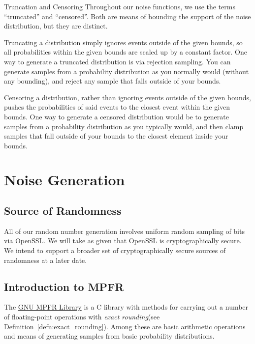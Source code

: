 \documentclass[11pt]{scrartcl} %
\begin{document}
\begin{definition}
	\label{def:truncation_censoring}
	Truncation and Censoring \newline
	Throughout our noise functions, we use the terms ``truncated'' and ``censored''.
	Both are means of bounding the support of the noise distribution, but they are distinct. \newline

	Truncating a distribution simply ignores events outside of the given bounds, so
	all probabilities within the given bounds are scaled up by a constant factor.
	One way to generate a truncated distribution is via rejection sampling.
	You can generate samples from a probability distribution as you normally would (without any bounding),
	and reject any sample that falls outside of your bounds. \newline

	Censoring a distribution, rather than ignoring events outside of the given bounds, pushes the
	probabilities of said events to the closest event within the given bounds. One way to generate
	a censored distribution would be to generate samples from a probability distribution as you
	typically would, and then clamp samples that fall outside of your bounds to the closest element
	inside your bounds.
\end{definition}

\section{Noise Generation}

\subsection{Source of Randomness}
All of our random number generation involves uniform random sampling of bits via OpenSSL.
We will take as given that OpenSSL is cryptographically secure. We intend to support a broader set 
of cryptographically secure sources of randomness at a later date.

\subsection{Introduction to MPFR}
The \href{https://www.mpfr.org/}{GNU MPFR Library}\cite{FHL+07} is a C library with methods for carrying out a number
of floating-point operations with \emph{exact rounding}(see Definition~\ref{defn:exact_rounding}).
Among these are basic arithmetic operations and means of generating samples from basic probability distributions. \newline 
\end{document}
